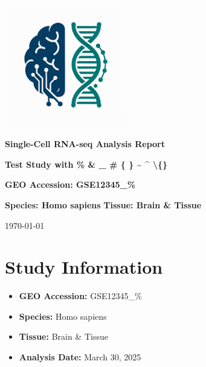 \documentclass[12pt]{article}
\begin{document}
\begin{titlepage}
    \centering
    \vspace*{2cm}

    \includegraphics[width=0.4\textwidth]{scagentic_logo.png}
    \vspace{1cm}

    \Huge\textbf{Single-Cell RNA-seq Analysis Report}
    \vspace{1cm}

    \Large\textbf{Test Study with \% \& \_ \# \{ \} \textasciitilde{} \textasciicircum{} \textbackslash\{\}}
    \vspace{0.5cm}

    \Large\textbf{GEO Accession: GSE12345\_\%}
    \vspace{0.5cm}

    \Large\textbf{Species: Homo sapiens}
    \vspace{0.5cm}
    \Large\textbf{Tissue: Brain \& Tissue}
    \vspace{1cm}

    \large\today
\end{titlepage}

\tableofcontents
\newpage

\section{Study Information}
\begin{itemize}
    \item \textbf{GEO Accession:} GSE12345\_\%
    \item \textbf{Species:} Homo sapiens
    \item \textbf{Tissue:} Brain \& Tissue
    \item \textbf{Analysis Date:} March 30, 2025
\end{itemize}
\end{document}
